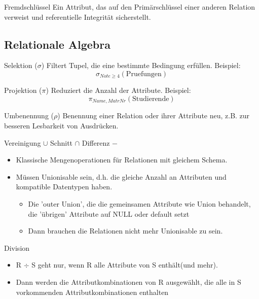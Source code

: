 \documentclass{article}
\begin{document}
\begin{block}{Fremdschlüssel}
Ein Attribut, das auf den Primärschlüssel einer anderen Relation verweist und referentielle Integrität sicherstellt.
\end{block}

\subsection*{Relationale Algebra}

\begin{block}{Selektion ($\sigma$)}
Filtert Tupel, die eine bestimmte Bedingung erfüllen. Beispiel:
\[
\sigma_{Note \geq 4}(\text{Pruefungen})
\]
\end{block}

\begin{block}{Projektion ($\pi$)}
Reduziert die Anzahl der Attribute. Beispiel:
\[
\pi_{Name, MatrNr}(\text{Studierende})
\]
\end{block}

\begin{block}{Umbenennung ($\rho$)}
Benennung einer Relation oder ihrer Attribute neu, z.B. zur besseren Lesbarkeit von Ausdrücken.
\end{block}

\begin{block}{Vereinigung $\cup$ Schnitt $\cap$ Differenz $-$}
  \begin{itemize}
    \item Klassische Mengenoperationen für Relationen mit gleichem Schema.
    \item Müssen Unionisable sein, d.h. die gleiche Anzahl an Attributen und kompatible Datentypen haben.
    \begin{itemize}
      \item Die 'outer Union', die die gemeinsamen Attribute wie Union behandelt, die 'übrigen' Attribute auf NULL oder default setzt
      \item Dann brauchen die Relationen nicht mehr Unionisable zu sein.
    \end{itemize}
  \end{itemize}
\end{block}

\begin{block}{Division}
  \begin{itemize}
    \item R $\div$ S geht nur, wenn R alle Attribute von S enthält(und mehr).
    \item Dann werden die Attributkombinationen von R ausgewählt, die alle in S vorkommenden Attributkombinationen enthalten
  \end{itemize}
\end{block}
\end{document}
